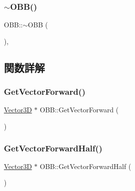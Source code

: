 \mbox{\label{class_o_b_b_aa95ab77e0c88faf68db43ed7f6b0ea5a}} 
\subsubsection{\texorpdfstring{$\sim$\+O\+B\+B()}{~OBB()}}
{\footnotesize\ttfamily O\+B\+B\+::$\sim$\+O\+BB (\begin{DoxyParamCaption}{ }\end{DoxyParamCaption})\hspace{0.3cm}{\ttfamily [inline]}, {\ttfamily [virtual]}}



\subsection{関数詳解}
\mbox{\label{class_o_b_b_a03fdc91609b94007369d3ba168dbb54d}} 
\subsubsection{\texorpdfstring{Get\+Vector\+Forward()}{GetVectorForward()}}
{\footnotesize\ttfamily \mbox{\hyperlink{class_vector3_d}{Vector3D}} $\ast$ O\+B\+B\+::\+Get\+Vector\+Forward (\begin{DoxyParamCaption}{ }\end{DoxyParamCaption})\hspace{0.3cm}{\ttfamily [inline]}}

\mbox{\label{class_o_b_b_a03218b64dad1985876e7bad09f4a61ce}} 
\subsubsection{\texorpdfstring{Get\+Vector\+Forward\+Half()}{GetVectorForwardHalf()}}
{\footnotesize\ttfamily \mbox{\hyperlink{class_vector3_d}{Vector3D}} $\ast$ O\+B\+B\+::\+Get\+Vector\+Forward\+Half (\begin{DoxyParamCaption}{ }\end{DoxyParamCaption})\hspace{0.3cm}{\ttfamily [inline]}}

